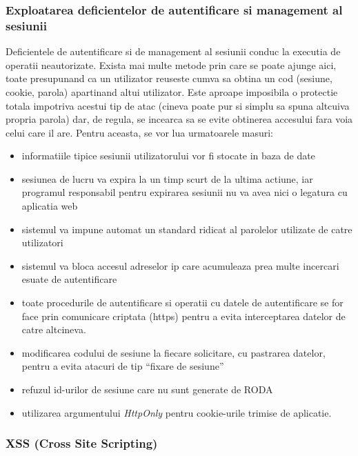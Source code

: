 \bigskip

\subsubsection{Exploatarea deficientelor de autentificare si management al
sesiunii}

\bigskip

{\sffamily\color{black}
Deficientele de autentificare si de management al sesiunii conduc la executia de operatii neautorizate. Exista mai multe
metode prin care se poate ajunge aici, toate presupunand ca un utilizator reuseste cumva sa obtina un cod (sesiune,
cookie, parola) apartinand altui utilizator. Este aproape imposibila o protectie totala impotriva acestui tip de atac
(cineva poate pur si simplu sa spuna altcuiva propria parola) dar, de regula, se incearca sa se evite obtinerea
accesului fara voia celui care il are. Pentru aceasta, se vor lua urmatoarele masuri:}
\begin{itemize}
\item
informatiile tipice sesiunii utilizatorului vor fi stocate in baza de date
\item
sesiunea de lucru va expira la un timp scurt de la ultima actiune, iar programul responsabil pentru expirarea sesiunii
nu va avea nici o legatura cu aplicatia web
\item 
sistemul va impune automat un standard ridicat al parolelor utilizate de
catre utilizatori
\item 
sistemul va bloca accesul adreselor ip care acumuleaza prea multe incercari esuate de autentificare
\item
toate procedurile de autentificare si operatii cu datele de autentificare
se for face prin comunicare criptata (https) pentru a evita interceptarea datelor de catre altcineva.
\item 
modificarea codului de sesiune la fiecare solicitare, cu pastrarea datelor, pentru a evita atacuri de tip ``fixare de
sesiune''
\item
refuzul id-urilor de sesiune care nu sunt generate de RODA
\item
utilizarea argumentului \textit{HttpOnly}\textit{ }pentru cookie-urile
trimise de aplicatie.
\end{itemize}

\subsubsection{XSS (Cross Site Scripting)}


